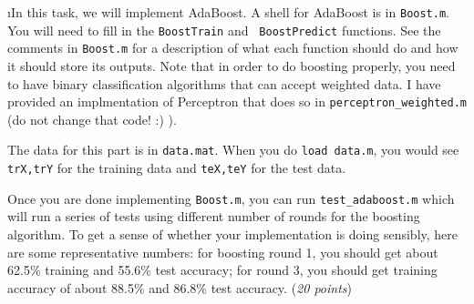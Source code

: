 \documentclass[fleqn]{article}
\begin{document}
\i In this task, we will implement AdaBoost.  A shell for AdaBoost is in
{\tt Boost.m}.  You will need to fill in the {\tt BoostTrain} and {\tt
  BoostPredict} functions.  See the comments in {\tt Boost.m} for a
description of what each function should do and how it should store
its outputs.  Note that in order to do boosting properly, you need to
have binary classification algorithms that can accept weighted data.
I have provided an implmentation of Perceptron that does so in
{\tt perceptron\_weighted.m} (do not change that code! :) ).

The data for this part is in {\tt data.mat}. When you do {\tt load data.m},
you would see {\tt trX,trY} for the training data and {\tt teX,teY} for
the test data.

Once you are done implementing {\tt Boost.m}, you can run {\tt test\_adaboost.m} 
which will run a series of tests using different number of rounds for the boosting 
algorithm. To get a sense of whether your implementation is doing sensibly, 
here are some representative numbers: for boosting round 1, you should get 
about 62.5\% training and 55.6\% test accuracy; for round 3, you should 
get training accuracy of about 88.5\% and 86.8\% test accuracy.
(\emph{20 points})

\ene
\end{document}
